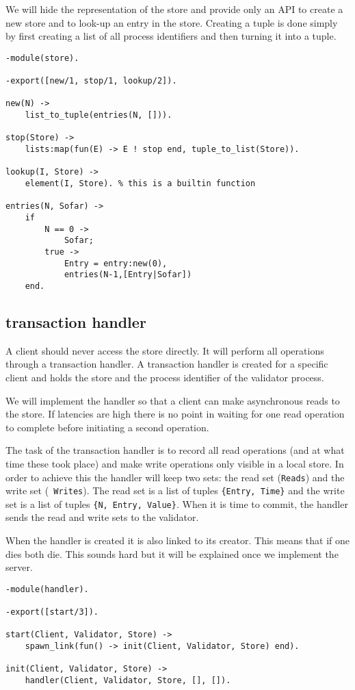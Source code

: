 \documentclass[a4paper, 11pt]{article}
\begin{document}
We will hide the representation of the store and provide only an API
to create a new store and to look-up an entry in the store. Creating a
tuple is done simply by first creating a list of all process
identifiers and then turning it into a tuple.
\begin{verbatim}
-module(store).

-export([new/1, stop/1, lookup/2]).

new(N) ->
    list_to_tuple(entries(N, [])).

stop(Store) ->
    lists:map(fun(E) -> E ! stop end, tuple_to_list(Store)).

lookup(I, Store) ->
    element(I, Store). % this is a builtin function

entries(N, Sofar) ->
    if 
        N == 0 ->
            Sofar;
        true ->
            Entry = entry:new(0),
            entries(N-1,[Entry|Sofar])
    end.
\end{verbatim}

\subsection{transaction handler}

A client should never access the store directly. It will perform all
operations through a transaction handler. A transaction handler is
created for a specific client and holds the store and the
process identifier of the validator process. 

We will implement the handler so that a client can make asynchronous
reads to the store. If latencies are high there is no point in waiting
for one read operation to complete before initiating a second
operation.

The task of the transaction handler is to record all read operations
(and at what time these took place) and make write operations only
visible in a local store. In order to achieve this the handler will
keep two sets: the read set ({\tt Reads}) and the write set ({\tt
  Writes}). The read set is a list of tuples {\tt \{Entry, Time\}} and
the write set is a list of tuples {\tt \{N, Entry, Value\}}. When it
is time to commit, the handler sends the read and write sets to the
validator.

When the handler is created it is also linked to its creator. This
means that if one dies both die. This sounds hard but it will be 
explained once we implement the server.

\begin{verbatim}
-module(handler).

-export([start/3]).

start(Client, Validator, Store) ->
    spawn_link(fun() -> init(Client, Validator, Store) end).

init(Client, Validator, Store) ->
    handler(Client, Validator, Store, [], []).
\end{verbatim}
\end{document}
